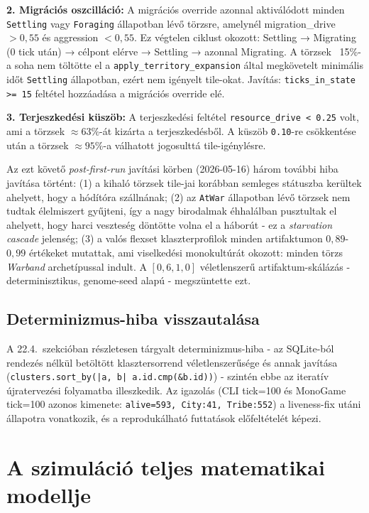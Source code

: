 ﻿\documentclass[a4paper,12pt]{report}
\begin{document}
\textbf{2. Migrációs oszcilláció:} A migrációs override azonnal aktiválódott minden \texttt{Settling} vagy \texttt{Foraging} állapotban lévő törzsre, amelynél migration\_drive $> 0{,}55$ és aggression $< 0{,}55$. Ez végtelen ciklust okozott: Settling → Migrating (0 tick után) → célpont elérve → Settling → azonnal Migrating. A törzsek ~15\%-a soha nem töltötte el a \texttt{apply\_territory\_expansion} által megkövetelt minimális időt \texttt{Settling} állapotban, ezért nem igényelt tile-okat. Javítás: \texttt{ticks\_in\_state >= 15} feltétel hozzáadása a migrációs override elé.

\textbf{3. Terjeszkedési küszöb:} A terjeszkedési feltétel \texttt{resource\_drive < 0.25} volt, ami a törzsek $\approx 63\%$-át kizárta a terjeszkedésből. A küszöb \texttt{0.10}-re csökkentése után a törzsek $\approx 95\%$-a válhatott jogosulttá tile-igénylésre.

Az ezt követő \textit{post-first-run} javítási körben (2026-05-16) három további hiba javítása történt: (1) a kihaló törzsek tile-jai korábban semleges státuszba kerültek ahelyett, hogy a hódítóra szállnának; (2) az \texttt{AtWar} állapotban lévő törzsek nem tudtak élelmiszert gyűjteni, így a nagy birodalmak éhhalálban pusztultak el ahelyett, hogy harci veszteség döntötte volna el a háborút - ez a \textit{starvation cascade} jelenség; (3) a valós flexset klaszterprofilok minden artifaktumon $0{,}89$-$0{,}99$ értékeket mutattak, ami viselkedési monokultúrát okozott: minden törzs \textit{Warband} archetípussal indult. A $[0{,}6, 1{,}0]$ véletlenszerű artifaktum-skálázás - determinisztikus, genome-seed alapú - megszüntette ezt.

\subsection*{Determinizmus-hiba visszautalása}

A 22.4.~szekcióban részletesen tárgyalt determinizmus-hiba - az SQLite-ból rendezés nélkül betöltött klasztersorrend véletlenszerűsége és annak javítása (\texttt{clusters.sort\_by(|a, b| a.id.cmp(\&b.id))}) - szintén ebbe az iteratív újratervezési folyamatba illeszkedik. Az igazolás (CLI tick=100 és MonoGame tick=100 azonos kimenete: \texttt{alive=593, City:41, Tribe:552}) a liveness-fix utáni állapotra vonatkozik, és a reprodukálható futtatások előfeltételét képezi.

\section{A szimuláció teljes matematikai modellje}
\label{sec:neurosim-26-mathmodel}
\end{document}

